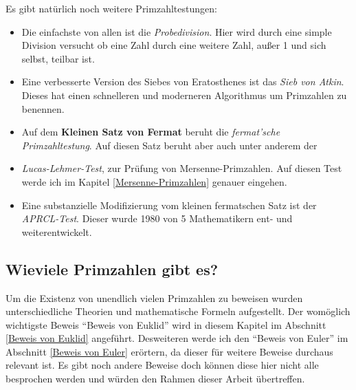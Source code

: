 \documentclass[12pt,a4paper]{article}
\theoremstyle{definition}
\begin{document}
Es gibt natürlich noch weitere Primzahltestungen:
\begin{itemize}
    \item Die einfachste von allen ist die \textit{Probedivision}.
    Hier wird durch eine simple Division versucht ob eine Zahl durch eine weitere Zahl, außer 1 und sich selbst, teilbar ist.
    \item Eine verbesserte Version des Siebes von Eratosthenes ist das \textit{Sieb von Atkin}.
    Dieses hat einen schnelleren und moderneren Algorithmus um Primzahlen zu benennen.
    \item Auf dem \textbf{Kleinen Satz von Fermat} beruht die \textit{fermat'sche Primzahltestung}.
    Auf diesen Satz beruht aber auch unter anderem der
    \item \textit{Lucas-Lehmer-Test}, zur Prüfung von Mersenne-Primzahlen.
    Auf diesen Test werde ich im Kapitel \ref{Mersenne-Primzahlen} genauer eingehen.
    \item Eine substanzielle Modifizierung vom kleinen fermatschen Satz ist der \textit{APRCL-Test}.
    Dieser wurde 1980 von 5 Mathematikern ent- und weiterentwickelt.
\end{itemize}

\subsection{Wieviele Primzahlen gibt es?}
Um die Existenz von unendlich vielen Primzahlen zu beweisen wurden unterschiedliche Theorien und mathematische Formeln aufgestellt.
Der womöglich wichtigste Beweis “Beweis von Euklid” wird in diesem Kapitel im Abschnitt \ref{Beweis von Euklid} angeführt. Desweiteren werde ich den “Beweis von Euler” im Abschnitt \ref{Beweis von Euler} erörtern, da dieser für weitere Beweise durchaus relevant ist.
Es gibt noch andere Beweise doch können diese hier nicht alle besprochen werden und würden den Rahmen dieser Arbeit übertreffen.
\end{document}
